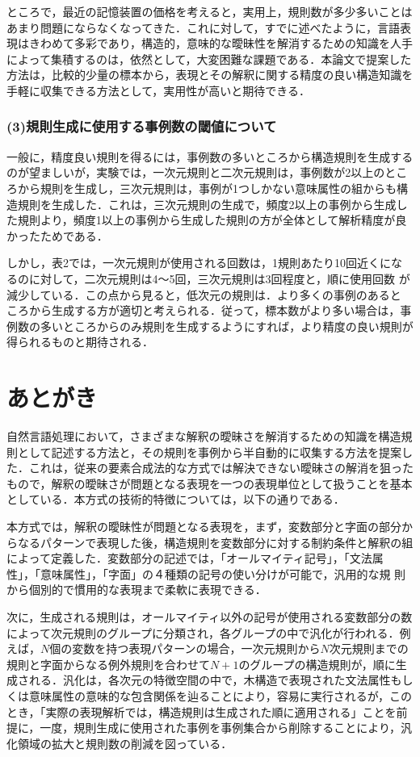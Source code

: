ところで，最近の記憶装置の価格を考えると，実用上，規則数が多少多いことは
あまり問題にならなくなってきた．これに対して，すでに述べたように，言語表
現はきわめて多彩であり，構造的，意味的な曖昧性を解消するための知識を人手
によって集積するのは，依然として，大変困難な課題である．本論文で提案した
方法は，比較的少量の標本から，表現とその解釈に関する精度の良い構造知識を
手軽に収集できる方法として，実用性が高いと期待できる．
\subsubsection*{(3)規則生成に使用する事例数の閾値について}
一般に，精度良い規則を得るには，事例数の多いところから構造規則を生成する
のが望ましいが，実験では，一次元規則と二次元規則は，事例数が2以上のとこ
ろから規則を生成し，三次元規則は，事例が1つしかない意味属性の組からも構
造規則を生成した．これは，三次元規則の生成で，頻度2以上の事例から生成し
た規則より，頻度1以上の事例から生成した規則の方が全体として解析精度が良
かったためである．

しかし，表2では，一次元規則が使用される回数は，1規則あたり10回近くにな
るのに対して，二次元規則は4〜5回，三次元規則は3回程度と，順に使用回数
が減少している．この点から見ると，低次元の規則は．より多くの事例のあると
ころから生成する方が適切と考えられる．従って，標本数がより多い場合は，事
例数の多いところからのみ規則を生成するようにすれば，より精度の良い規則が
得られるものと期待される．
\section{あとがき}
自然言語処理において，さまざまな解釈の曖昧さを解消するための知識を構造規
則として記述する方法と，その規則を事例から半自動的に収集する方法を提案し
た．これは，従来の要素合成法的な方式では解決できない曖昧さの解消を狙った
もので，解釈の曖昧さが問題となる表現を一つの表現単位として扱うことを基本
としている．本方式の技術的特徴については，以下の通りである．

本方式では，解釈の曖昧性が問題となる表現を，まず，変数部分と字面の部分か
らなるパターンで表現した後，構造規則を変数部分に対する制約条件と解釈の組
によって定義した．変数部分の記述では，「オールマイティ記号」，「文法属
性」，「意味属性」，「字面」の４種類の記号の使い分けが可能で，汎用的な規
則から個別的で慣用的な表現まで柔軟に表現できる．

次に，生成される規則は，オールマイティ以外の記号が使用される変数部分の数
によって次元規則のグループに分類され，各グループの中で汎化が行われる．例
えば，$N$個の変数を持つ表現パターンの場合，一次元規則から$N$次元規則までの
規則と字面からなる例外規則を合わせて$N+1$のグループの構造規則が，順に生
成される．汎化は，各次元の特徴空間の中で，木構造で表現された文法属性もし
くは意味属性の意味的な包含関係を辿ることにより，容易に実行されるが，この
とき，「実際の表現解析では，構造規則は生成された順に適用される」ことを前
提に，一度，規則生成に使用された事例を事例集合から削除することにより，汎
化領域の拡大と規則数の削減を図っている．

